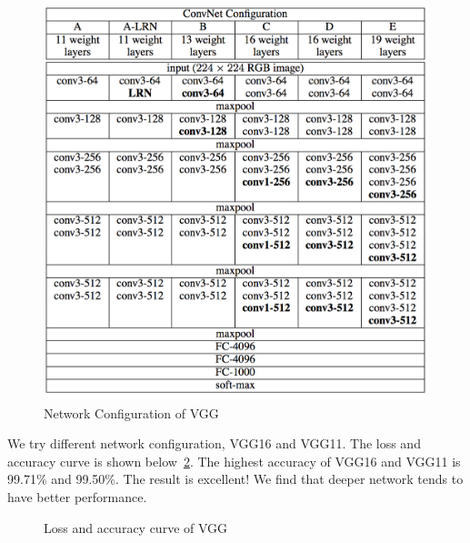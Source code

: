 \documentclass{article}
\begin{document}
\begin{figure}[!htb]
	\centering\includegraphics[width=1.0\textwidth]{fig/vgg.jpg}
	\caption{Network Configuration of  VGG\protect\footnotemark}\label{fig:vgg}
\end{figure}
We try different network configuration, VGG16 and VGG11.  The loss and accuracy curve is shown below~\ref{fig:vgg-curve}. The highest accuracy of VGG16 and VGG11 is 99.71\% and 99.50\%. The result is excellent! We find that deeper network tends to have better performance. 

\begin{figure}[!htb]
	\centering
{}
\caption{Loss and accuracy curve of  VGG}
\label{fig:vgg-curve}
\end{figure}
\end{document}
